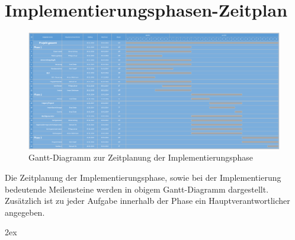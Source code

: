 \documentclass[12pt,a4paper,titlepage]{article}
\begin{document}
\section{Implementierungsphasen-Zeitplan}
\begin{figure}[!ht]
\centering
\includegraphics[angle=90, scale=0.48]{Gantt-Diagramm} \caption{Gantt-Diagramm zur Zeitplanung der Implementierungsphase}
\end{figure}
Die Zeitplanung der Implementierungsphase, sowie bei der Implementierung bedeutende Meilensteine werden in obigem Gantt-Diagramm dargestellt. Zusätzlich ist zu jeder Aufgabe innerhalb der Phase ein Hauptverantwortlicher angegeben.


\begingroup
\parindent 0pt
\parskip 2ex
\def\enotesize{\normalsize}

\endgroup
\end{document}
